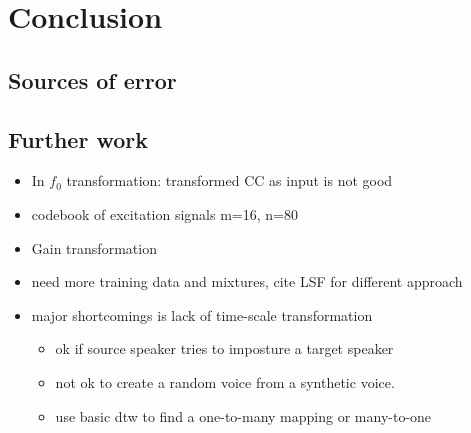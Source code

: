 \chapter{Conclusion} %
\label{cha:conclusion}

\section{Sources of error} %
\label{sec:sources_of_error}



\section{Further work} %
\label{sec:further_work}
\begin{itemize}
	\item In $f_0$ transformation: transformed CC as input is not good
	\item codebook of excitation signals m=16, n=80
	\item Gain transformation
	\item need more training data and mixtures, cite LSF for different approach
	\item major shortcomings is lack of time-scale transformation
	\begin{itemize}
		\item ok if source speaker tries to imposture a target speaker
		\item not ok to create a random voice from a synthetic voice.
		\item use basic dtw to find a one-to-many mapping or many-to-one
	\end{itemize}
\end{itemize}

